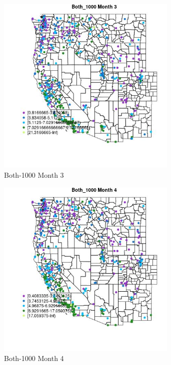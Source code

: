 \begin{figure} 
\centering  
\includegraphics[width=0.77\textwidth]{Code_Outputs/ML_input_report_ML_input_PM25_Step5_part_d_de_duplicated_aves_ML_input_MapObsMo3Both_1000.jpg} 
\caption{\label{fig:ML_input_report_ML_input_PM25_Step5_part_d_de_duplicated_aves_ML_inputMapObsMo3Both_1000}Both-1000 Month 3} 
\end{figure} 
 

\begin{figure} 
\centering  
\includegraphics[width=0.77\textwidth]{Code_Outputs/ML_input_report_ML_input_PM25_Step5_part_d_de_duplicated_aves_ML_input_MapObsMo4Both_1000.jpg} 
\caption{\label{fig:ML_input_report_ML_input_PM25_Step5_part_d_de_duplicated_aves_ML_inputMapObsMo4Both_1000}Both-1000 Month 4} 
\end{figure} 
 

